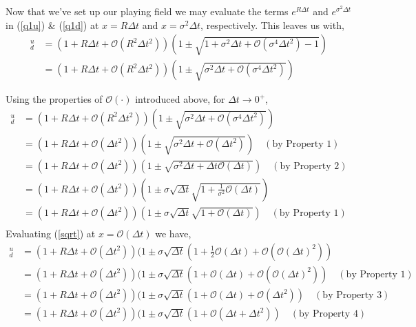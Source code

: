 \documentclass[12pt]{article}
\begin{document}
\noindent Now that we've set up our playing field we may evaluate the terms $e^{R\Delta t}$ and $e^{\sigma^2\Delta t}$ in (\ref{q1u}) \& (\ref{q1d}) at $x = R\Delta t$ and $x = \sigma^2\Delta t$, respectively. This leaves us with,
\begin{align*}
	^u_d & = (1 + R\Delta t + \mathcal O(R^2\Delta t^2))(1 \pm \sqrt{1 + \sigma^2\Delta t + \mathcal O(\sigma^4\Delta t^2) - 1}) \\
	& =  (1 + R\Delta t + \mathcal O(R^2\Delta t^2))(1 \pm \sqrt{\sigma^2\Delta t + \mathcal O(\sigma^4\Delta t^2)})
\end{align*}

\noindent Using the properties of $\mathcal O(\cdot)$ introduced above, for $\Delta t \longrightarrow 0^+$,
\begin{align*}
	^u_d  & =  (1 + R\Delta t + \mathcal O(R^2\Delta t^2))(1 \pm \sqrt{\sigma^2\Delta t + \mathcal O(\sigma^4\Delta t^2)}) \\
	& = (1 + R\Delta t + \mathcal O(\Delta t^2))(1 \pm \sqrt{\sigma^2\Delta t + \mathcal O(\Delta t^2)}) \quad (\text{by Property 1}) \\
	& = (1 + R\Delta t + \mathcal O(\Delta t^2))(1 \pm \sqrt{\sigma^2\Delta t + \Delta t \mathcal O(\Delta t)}) \quad (\text{by Property 2}) \\
	& = (1 + R\Delta t + \mathcal O(\Delta t^2))(1 \pm \sigma\sqrt{\Delta t}\sqrt{1 + \frac{1}{\sigma^2}\mathcal O(\Delta t)}) \\
	& = (1 + R\Delta t + \mathcal O(\Delta t^2))(1 \pm \sigma\sqrt{\Delta t}\sqrt{1 + \mathcal O(\Delta t)}) \quad (\text{by Property 1}) \\
\end{align*}
Evaluating (\ref{sqrt}) at $x = \mathcal O(\Delta t)$ we have,
\begin{align*}
	^u_d  & = (1 + R\Delta t + \mathcal O(\Delta t^2))(1 \pm \sigma\sqrt{\Delta t}(1 + \frac{1}{2}\mathcal O(\Delta t) + \mathcal O(\mathcal O(\Delta t)^2)) \\
	& = (1 + R\Delta t + \mathcal O(\Delta t^2))(1 \pm \sigma\sqrt{\Delta t}(1 + \mathcal O(\Delta t) + \mathcal O(\mathcal O(\Delta t)^2)) \quad (\text{by Property 1}) \\
	& = (1 + R\Delta t + \mathcal O(\Delta t^2))(1 \pm \sigma\sqrt{\Delta t}(1 + \mathcal O(\Delta t) + \mathcal O(\Delta t^2)) \quad (\text{by Property 3}) \\
	& = (1 + R\Delta t + \mathcal O(\Delta t^2))(1 \pm \sigma\sqrt{\Delta t}(1 + \mathcal O(\Delta t + \Delta t^2)) \quad (\text{by Property 4}) \\
\end{align*}
\end{document}
